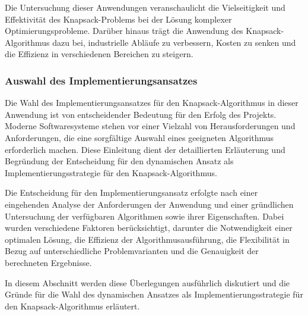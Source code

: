 Die Untersuchung dieser Anwendungen veranschaulicht die Vielseitigkeit und Effektivität des Knapsack-Problems bei der Lösung
komplexer Optimierungsprobleme. Darüber hinaus trägt die Anwendung des Knapsack-Algorithmus dazu bei, industrielle Abläufe
zu verbessern, Kosten zu senken und die Effizienz in verschiedenen Bereichen zu steigern.

\subsubsection{Auswahl des Implementierungsansatzes}
Die Wahl des Implementierungsansatzes für den Knapsack-Algorithmus in dieser Anwendung ist von entscheidender Bedeutung
für den Erfolg des Projekts. Moderne Softwaresysteme stehen vor einer Vielzahl von Herausforderungen und Anforderungen,
die eine sorgfältige Auswahl eines geeigneten Algorithmus erforderlich machen. Diese Einleitung dient der detaillierten
Erläuterung und Begründung der Entscheidung für den dynamischen Ansatz als Implementierungsstrategie für den Knapsack-Algorithmus.

Die Entscheidung für den Implementierungsansatz erfolgte nach einer eingehenden Analyse der Anforderungen der Anwendung
und einer gründlichen Untersuchung der verfügbaren Algorithmen sowie ihrer Eigenschaften. Dabei wurden verschiedene
Faktoren berücksichtigt, darunter die Notwendigkeit einer optimalen Lösung, die Effizienz der Algorithmusausführung, die
Flexibilität in Bezug auf unterschiedliche Problemvarianten und die Genauigkeit der berechneten Ergebnisse.

In diesem Abschnitt werden diese Überlegungen ausführlich diskutiert und die Gründe für die Wahl des dynamischen Ansatzes
als Implementierungsstrategie für den Knapsack-Algorithmus erläutert.


